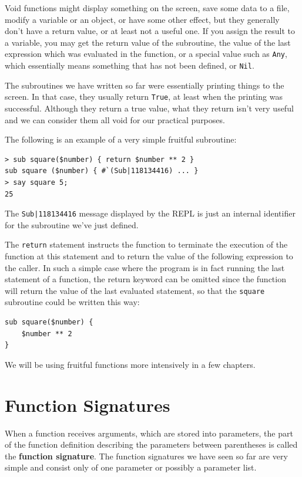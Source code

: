 Void functions might display something on the screen, 
save some data to a file, modify a variable or an object, 
or have some other effect, but they generally don't have 
a return value, or at least not a useful one.  If you assign 
the result to a variable, you may get the return value of 
the subroutine, the value of the last expression which was 
evaluated in the function, or a special value such as 
{\tt Any}, which essentially means something that has not 
been defined, or {\tt Nil}.
%

The subroutines we have written so far were essentially 
printing things to the screen. In that case, they 
usually return {\tt True}, at least when the printing 
was successful. Although they return a true value, what they 
return isn't very useful and we can consider them all void 
for our practical purposes.  

The following is an example of a very simple fruitful subroutine:

\begin{verbatim}
> sub square($number) { return $number ** 2 }
sub square ($number) { #`(Sub|118134416) ... }
> say square 5;
25
\end{verbatim}

The \verb'Sub|118134416' message displayed by the REPL is 
just an internal identifier for the subroutine we've just 
defined.

The {\tt return} statement instructs the function to terminate 
the execution of the function at this statement and to return 
the value of the following expression to the caller. In such a simple 
case where the program is in fact running the last statement 
of a function, the return keyword can be omitted since the function 
will return the value of the last evaluated statement, so that the 
{\tt square} subroutine could be written this way:
\begin{verbatim}
sub square($number) { 
    $number ** 2 
}
\end{verbatim}

We will be using fruitful functions more intensively in a 
few chapters.

\section{Function Signatures}

When a function receives arguments, which are stored into 
parameters, the part of the function 
definition describing the parameters between parentheses 
is called the {\bf function signature}. The function signatures 
we have seen so far are very simple and consist only of one 
parameter or possibly a parameter list.

